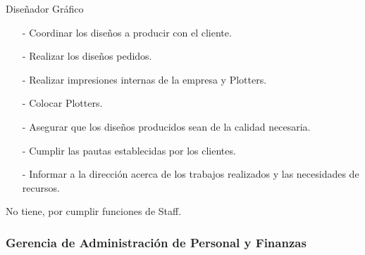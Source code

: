 \documentclass[a4paper,10pt,titlepage]{article}
\begin{document}
{
    Dise\~nador Gr\'afico
}
{
    \begin{itemize}
        \item[-] Coordinar los dise\~nos a producir con el cliente.
        \item[-] Realizar los dise\~nos pedidos.
        \item[-] Realizar impresiones internas de la empresa y Plotters.
        \item[-] Colocar Plotters.
    \end{itemize}
}
{
    \begin{itemize}
        \item[-] Asegurar que los dise\~nos producidos sean de la calidad necesaria.
        \item[-] Cumplir las pautas establecidas por los clientes.
        \item[-] Informar a la direcci\'on acerca de los trabajos realizados y las necesidades de recursos.
    \end{itemize}
}
{
    No tiene, por cumplir funciones de Staff.
}
\newpage
\subsubsection{Gerencia de Administraci\'on de Personal y Finanzas}
\end{document}

